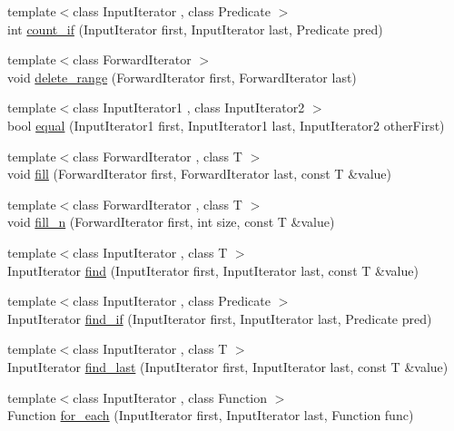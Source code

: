 \begin{DoxyCompactItemize}
\item 
{\footnotesize template$<$class Input\+Iterator , class Predicate $>$ }\\int \hyperlink{namespaceprism_af0007d361beae18a930b6249752e509e}{count\+\_\+if} (Input\+Iterator first, Input\+Iterator last, Predicate pred)
\item 
{\footnotesize template$<$class Forward\+Iterator $>$ }\\void \hyperlink{namespaceprism_a83e62e5b148c55f949e5ea843d53ad67}{delete\+\_\+range} (Forward\+Iterator first, Forward\+Iterator last)
\item 
{\footnotesize template$<$class Input\+Iterator1 , class Input\+Iterator2 $>$ }\\bool \hyperlink{namespaceprism_ad3bede9a0f2c648e93677b14c45b1b7b}{equal} (Input\+Iterator1 first, Input\+Iterator1 last, Input\+Iterator2 other\+First)
\item 
{\footnotesize template$<$class Forward\+Iterator , class T $>$ }\\void \hyperlink{namespaceprism_a7c33653a5b4a07b31f5bde15e9085b45}{fill} (Forward\+Iterator first, Forward\+Iterator last, const T \&value)
\item 
{\footnotesize template$<$class Forward\+Iterator , class T $>$ }\\void \hyperlink{namespaceprism_aceb4b9c511a5edb706296b457427b226}{fill\+\_\+n} (Forward\+Iterator first, int size, const T \&value)
\item 
{\footnotesize template$<$class Input\+Iterator , class T $>$ }\\Input\+Iterator \hyperlink{namespaceprism_a1b543d9c2862a539cc8b770abda87561}{find} (Input\+Iterator first, Input\+Iterator last, const T \&value)
\item 
{\footnotesize template$<$class Input\+Iterator , class Predicate $>$ }\\Input\+Iterator \hyperlink{namespaceprism_aa17e9e6c80f8a52479a52450a108a636}{find\+\_\+if} (Input\+Iterator first, Input\+Iterator last, Predicate pred)
\item 
{\footnotesize template$<$class Input\+Iterator , class T $>$ }\\Input\+Iterator \hyperlink{namespaceprism_a3189014b9fa31e0ef0d1933c6f616618}{find\+\_\+last} (Input\+Iterator first, Input\+Iterator last, const T \&value)
\item 
{\footnotesize template$<$class Input\+Iterator , class Function $>$ }\\Function \hyperlink{namespaceprism_aae062d5bfdc0e53ae49c56520aded906}{for\+\_\+each} (Input\+Iterator first, Input\+Iterator last, Function func)

\end{DoxyCompactItemize}
